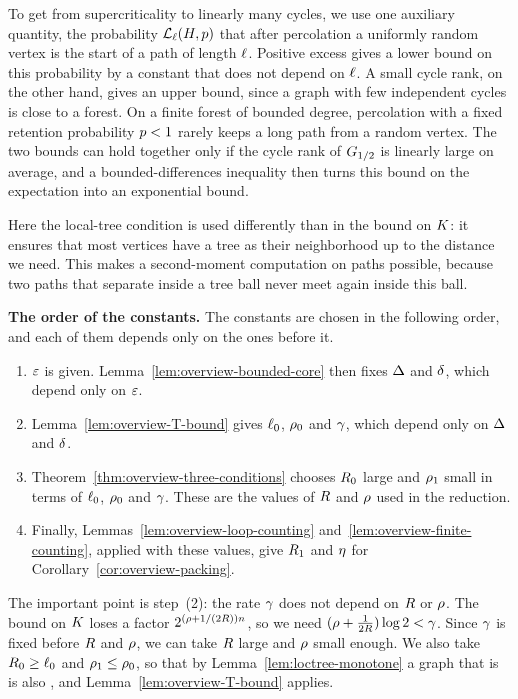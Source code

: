 To get from supercriticality to linearly many cycles, we use one auxiliary
quantity, the probability \(\mathcal{L}_{\ell}(H,p)\) that after percolation
a uniformly random vertex is the start of a path of length \(\ell\). Positive
excess gives a lower bound on this probability by a constant that does not
depend on \(\ell\). A small cycle rank, on the other hand, gives an upper
bound, since a graph with few independent cycles is close to a forest. On a
finite forest of bounded degree, percolation with a fixed retention probability
\(p<1\) rarely keeps a long path from a random vertex. The two bounds can
hold together only if the cycle rank of \(G_{1/2}\) is linearly large
on average, and a bounded-differences inequality then turns this bound on the
expectation into an exponential bound.

Here the local-tree condition is used differently than in the bound on
\(K\): it ensures that most vertices have a tree as their neighborhood up
to the distance we need. This makes a second-moment computation on paths
possible, because two paths that separate inside a tree ball never meet again
inside this ball.

\medskip
\noindent\textbf{The order of the constants.} The constants are chosen in the
following order, and each of them depends only on the ones before it.
\begin{enumerate}[label=(\arabic*),leftmargin=3em]
\item \(\varepsilon\) is given. Lemma~\ref{lem:overview-bounded-core} then fixes
  \(\Delta\) and \(\delta\), which depend only on \(\varepsilon\).
\item Lemma~\ref{lem:overview-T-bound} gives \(\ell_0\), \(\rho_0\) and
  \(\gamma\), which depend only on \(\Delta\) and \(\delta\).
\item Theorem~\ref{thm:overview-three-conditions} chooses \(R_0\) large and
  \(\rho_1\) small in terms of \(\ell_0\), \(\rho_0\) and \(\gamma\). These
  are the values of \(R\) and \(\rho\) used in the reduction.
\item Finally, Lemmas~\ref{lem:overview-loop-counting}
  and~\ref{lem:overview-finite-counting}, applied with these values, give
  \(R_1\) and \(\eta\) for Corollary~\ref{cor:overview-packing}.
\end{enumerate}
The important point is step~(2): the rate \(\gamma\) does not depend on \(R\)
or \(\rho\). The bound on \(K\) loses a factor
\(2^{(\rho+1/(2R))n}\), so we need
\((\rho+\frac1{2R})\log2<\gamma\). Since \(\gamma\) is fixed before
\(R\) and \(\rho\), we can take \(R\) large and \(\rho\) small
enough. We also take \(R_0\ge\ell_0\) and \(\rho_1\le\rho_0\), so that
by Lemma~\ref{lem:loctree-monotone} a graph that is
\loctree{\radz}{\nontreeo} is also \loctree{\plenz}{\nontreez}, and
Lemma~\ref{lem:overview-T-bound} applies.

